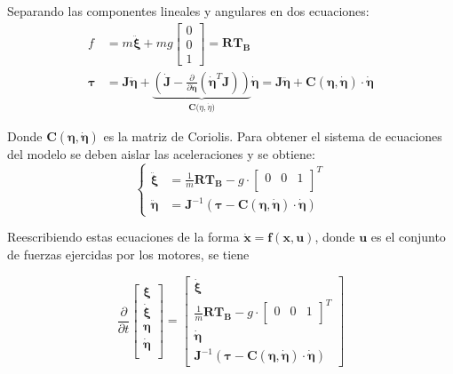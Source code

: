 \documentclass[twoside]{article}
\begin{document}
Separando las componentes lineales y angulares en dos ecuaciones:
\begin{align}
f & = m \pmb{\ddot{\xi}} + mg \left[ \begin{array}{c}
0 \\
0 \\
1
\end{array} \right] =\pmb{R}\pmb{T_B}\\
\pmb{\tau} & =\pmb{J} \pmb{\ddot{\eta}} +  \underbrace{\left( \pmb{\dot{J}} - \frac{\partial}{\partial \pmb{\dot{\eta}}}(\pmb{\dot{\eta}}^{T}\pmb{J})\right)}_{\pmb{C(}\eta,\dot{\eta}\pmb{)}} \pmb{\dot{\eta}} =\pmb{J} \pmb{\ddot{\eta}} +  \pmb{C(\eta,\dot{\eta})}\cdot\pmb{\dot{\eta}} 
\end{align}

Donde $\pmb{C(\eta,\dot{\eta})}$ es la matriz de Coriolis. 
Para obtener el sistema de ecuaciones del modelo se deben aislar las aceleraciones y se obtiene:
\begin{equation}
\begin{cases}
\pmb{\ddot{\xi}} & =\frac{1}{m}\pmb{R}\pmb{T_{B}} - g \cdot \left[ \begin{array}{ccc}
0 & 0 & 1\\
\end{array} \right]^{T} \\
\pmb{\ddot{\eta}} & =\pmb{J}^{-1} \left( \pmb{\tau} - \pmb{C(\eta,\dot{\eta})}\cdot\pmb{\dot{\eta}}  \right)
\end{cases}
\label{eq:system}
\end{equation}

Reescribiendo estas ecuaciones de la forma $\pmb{\dot{x}}=\pmb{f(x,u)}$, donde $\pmb{u}$ es el conjunto de fuerzas ejercidas por los motores, se tiene 

\begin{equation}
\frac{\partial}{\partial t}\left[ \begin{array}{l}
\pmb{\xi} \\
\pmb{\dot{\xi}} \\
\pmb{\eta} \\
\pmb{\dot{\eta}} \\
\end{array} \right] =\left[ \begin{array}{l}
\pmb{\dot{\xi}} \\
\frac{1}{m}\pmb{R}\pmb{T_{B}} - g \cdot \left[ \begin{array}{ccc}
0 & 0 & 1 \\
\end{array} \right]^{T} \\
\pmb{\dot{\eta}} \\
\pmb{J}^{-1} \left( \pmb{\tau} - \pmb{C(\eta,\dot{\eta})}\cdot\pmb{\dot{\eta}} \right)
\end{array} \right]
\end{equation}
\end{document}
